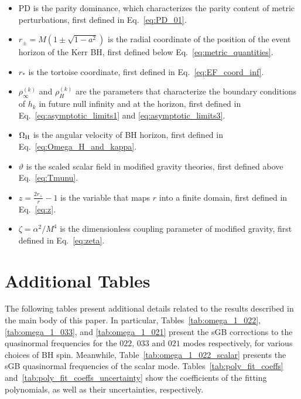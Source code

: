 \documentclass[aps,prx,amsmath,floats,floatfix,twocolumn,
  superscriptaddress,nofootinbib,showpacs]{revtex4-1}
\begin{document}
\begin{itemize}
    \item PD is the parity dominance, which characterizes the parity content of metric perturbations, first defined in Eq.~\eqref{eq:PD_01}.
    \item $r_\pm = M(1\pm\sqrt{1-a^2})$ is the radial coordinate of the position of the event horizon of the Kerr BH, first defined below Eq.~\eqref{eq:metric_quantities}. 
    \item $r_*$ is the tortoise coordinate, first defined in Eq.~\eqref{eq:EF_coord_inf}. 
    \item $\rho_{\infty}^{(k)}$ and $\rho_H^{(k)}$ are the parameters that characterize the boundary conditions of $h_k$ in future null infinity and at the horizon, first defined in Eq.~\eqref{eq:asymptotic_limits1} and \eqref{eq:asymptotic_limits3}.
    \item $\Omega_{\rm H}$ is the angular velocity of BH horizon, first defined in Eq.~\eqref{eq:Omega_H_and_kappa}. 
    \item $\vartheta$ is the scaled scalar field in modified gravity theories, first defined above Eq.~\eqref{eq:Tmunu}. 
    \item $z = \frac{2 r_+}{r} - 1$ is the variable that maps $r$ into a finite domain, first defined in Eq.~\eqref{eq:z}. 
    \item $\zeta = \alpha^2 / M^4 $ is the dimensionless coupling parameter of modified gravity, first defined in Eq.~\eqref{eq:zeta}. 
\end{itemize}

\section{Additional Tables}
\label{sec:Appendix_B}

The following tables present additional details related to the results described in the main body of this paper. In particular, Tables~\ref{tab:omega_1_022}, \ref{tab:omega_1_033}, and \ref{tab:omega_1_021} present the sGB corrections to the quasinormal frequencies for the $022$, $033$ and $021$ modes respectively, for various choices of BH spin. Meanwhile, Table~\ref{tab:omega_1_022_scalar} presents the sGB quasinormal frequencies of the scalar mode. Tables~\ref{tab:poly_fit_coeffs} and~\ref{tab:poly_fit_coeffs_uncertainty} show the coefficients of the fitting polynomials, as well as their uncertainties, respectively.   
\end{document}
